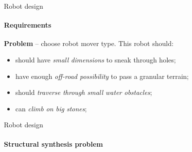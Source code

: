 \documentclass[aspectratio=169]{beamer}
\begin{document}
\begin{frame}[t]{Robot design}
    \framesubtitle{Requirements}
    \Large
    \textbf{Problem} --  choose robot mover type. This robot should:
    \begin{itemize}
        \item should have \textit{small dimensions} to sneak through holes;
        \item have enough \textit{off-road possibility} to pass a granular terrain;
        \item should \textit{traverse through small water obstacles};
        \item can \textit{climb on big stones};
    \end{itemize}
\end{frame}

\begin{frame}[t]{Robot design}
    \framesubtitle{Structural synthesis problem}
\end{frame}
\end{document}
